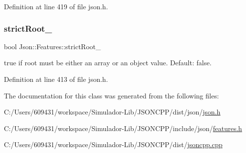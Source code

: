 Definition at line 419 of file json.\+h.

\hypertarget{class_json_1_1_features_a1162c37a1458adc32582b585b552f9c3}{}\label{class_json_1_1_features_a1162c37a1458adc32582b585b552f9c3} 
\subsubsection{\texorpdfstring{strict\+Root\+\_\+}{strictRoot\_}}
{\footnotesize\ttfamily bool Json\+::\+Features\+::strict\+Root\+\_\+}

{\ttfamily true} if root must be either an array or an object value. Default\+: {\ttfamily false}. 

Definition at line 413 of file json.\+h.



The documentation for this class was generated from the following files\+:\begin{DoxyCompactItemize}
\item 
C\+:/\+Users/609431/workspace/\+Simulador-\/\+Lib/\+J\+S\+O\+N\+C\+P\+P/dist/json/\hyperlink{dist_2json_2json_8h}{json.\+h}\item 
C\+:/\+Users/609431/workspace/\+Simulador-\/\+Lib/\+J\+S\+O\+N\+C\+P\+P/include/json/\hyperlink{features_8h}{features.\+h}\item 
C\+:/\+Users/609431/workspace/\+Simulador-\/\+Lib/\+J\+S\+O\+N\+C\+P\+P/dist/\hyperlink{jsoncpp_8cpp}{jsoncpp.\+cpp}\end{DoxyCompactItemize}
